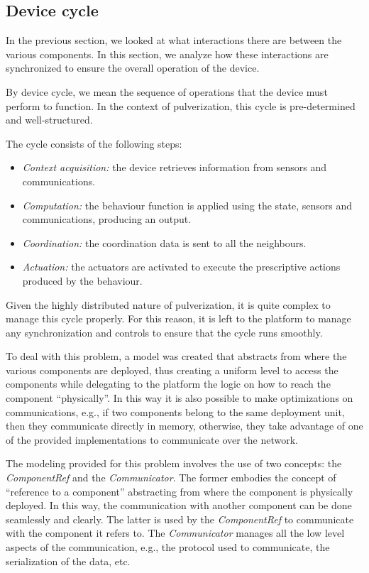 \subsection{Device cycle}
\label{sec:framework-device-cycle}

In the previous section, we looked at what interactions there are between the various components. In this section, we analyze how these interactions
are synchronized to ensure the overall operation of the device.

By device cycle, we mean the sequence of operations that the device must perform to function. In the context of pulverization, this cycle is
pre-determined and well-structured.

The cycle consists of the following steps:

\begin{itemize}
	\item \emph{Context acquisition:} the device retrieves information from sensors and communications.
	\item \emph{Computation:} the behaviour function is applied using the state, sensors and communications, producing an output.
	\item \emph{Coordination:} the coordination data is sent to all the neighbours.
	\item \emph{Actuation:} the actuators are activated to execute the prescriptive actions produced by the behaviour.
\end{itemize}

Given the highly distributed nature of pulverization, it is quite complex to manage this cycle properly. For this reason, it is left to the platform
to manage any synchronization and controls to ensure that the cycle runs smoothly.

To deal with this problem, a model was created that abstracts from where the various components are deployed, thus creating a uniform level
to access the components while delegating to the platform the logic on how to reach the component ``physically''. In this way it is also possible
to make optimizations on communications, e.g., if two components belong to the same deployment unit, then they communicate directly in memory,
otherwise, they take advantage of one of the provided implementations to communicate over the network.

The modeling provided for this problem involves the use of two concepts: the \emph{ComponentRef} and the \emph{Communicator}.
The former embodies the concept of ``reference to a component'' abstracting from where the component is physically deployed. In this way, the
communication with another component can be done seamlessly and clearly.
The latter is used by the \emph{ComponentRef} to communicate with the component it refers to. The \emph{Communicator} manages all the low level
aspects of the communication, e.g., the protocol used to communicate, the serialization of the data, etc.

